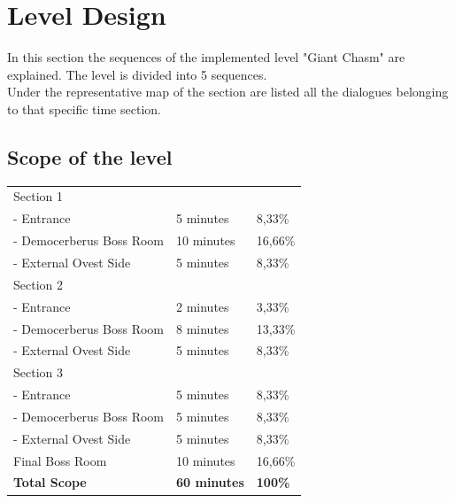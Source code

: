 \section{Level Design}
In this section the sequences of the implemented level "Giant Chasm" are explained. The level is divided into 5 sequences.\\
Under the representative map of the section are listed all the dialogues belonging to that specific time section.

\subsection{Scope of the level}

\vspace*{0.5cm}

\begin{center}
	\begin{tabular}[c]{| p{6cm} | p{4cm} | p{3cm} |}
		\hline
		Section 1 &                & \\
		 - Entrance                   & 5 minutes                  & 8,33\%                 \\
		 - Democerberus Boss Room          & 10 minutes                  & 16,66\%                 \\
		 - External Ovest Side           & 5 minutes			                & 8,33\%	                  \\ \hline
		 Section 2 &                & \\
		 - Entrance                   & 2 minutes                  & 3,33\%                 \\
		 - Democerberus Boss Room          & 8 minutes                  & 13,33\%                 \\
		 - External Ovest Side           & 5 minutes		                & 8,33\%                  \\ \hline
		 Section 3 &                & \\
		 - Entrance                   & 5 minutes                  & 8,33\%                 \\
		 - Democerberus Boss Room          & 5 minutes                  & 8,33\%                 \\
		 - External Ovest Side           & 5 minutes			                & 8,33\%	                  \\ \hline
		 Final Boss Room           & 10	minutes		                & 16,66\%	                  \\ \hline
		 \textbf{Total Scope}              & \textbf{60 minutes} & \textbf{100\%}      \\ \hline
	\end{tabular}
\end{center}

